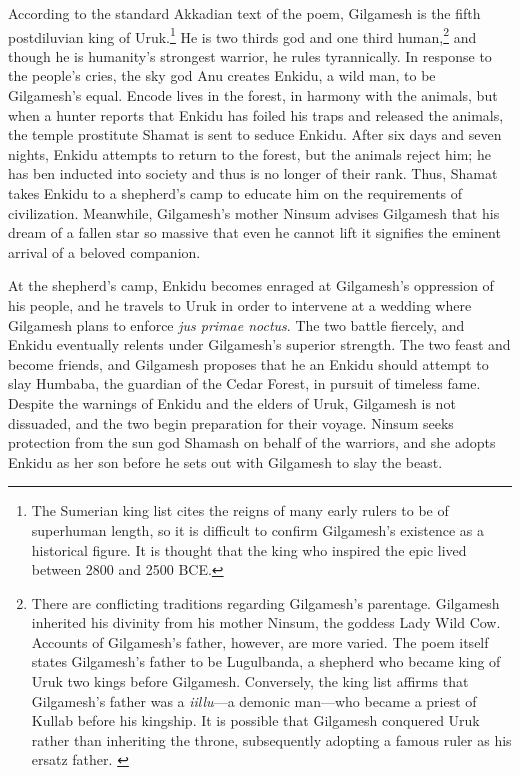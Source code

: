 \documentclass[10pt,a4paper]{article}
\begin{document}
According to the standard Akkadian text of the poem, Gilgamesh is the fifth postdiluvian king of Uruk.\footnote{The Sumerian king list cites the reigns of many early rulers to be of superhuman length, so it is difficult to confirm Gilgamesh’s existence as a historical figure. It is thought that the king who inspired the epic lived between 2800 and 2500 BCE.\cite{dalley2000myths}} He is two thirds god and one third human,\footnote{There are conflicting traditions regarding Gilgamesh’s parentage. Gilgamesh inherited his divinity from his mother Ninsum, the goddess Lady Wild Cow. Accounts of Gilgamesh’s father, however, are more varied. The poem itself states Gilgamesh’s father to be Lugulbanda, a shepherd who became king of Uruk two kings before Gilgamesh. Conversely, the king list affirms that Gilgamesh’s father was a \emph{iillu}—a demonic man—who became a priest of Kullab before his kingship. It is possible that Gilgamesh conquered Uruk rather than inheriting the throne, subsequently adopting a famous ruler as his ersatz father. \cite{dalley2000myths}} and though he is humanity’s strongest warrior, he rules tyrannically. In response to the people’s cries, the sky god Anu creates Enkidu, a wild man, to be Gilgamesh’s equal. Encode lives in the forest, in harmony with the animals, but when a hunter reports that Enkidu has foiled his traps and released the animals, the temple prostitute Shamat is sent to seduce Enkidu. After six days and seven nights, Enkidu attempts to return to the forest, but the animals reject him; he has ben inducted into society and thus is no longer of their rank. Thus, Shamat takes Enkidu to a shepherd’s camp to educate him on the requirements of civilization. Meanwhile, Gilgamesh’s mother Ninsum advises Gilgamesh that his dream of a fallen star so massive that even he cannot lift it signifies the eminent arrival of a beloved companion.

At the shepherd’s camp, Enkidu becomes enraged at Gilgamesh’s oppression of his people, and he travels to Uruk in order to intervene at a wedding where Gilgamesh plans to enforce \emph{jus primae noctus}. The two battle fiercely, and Enkidu eventually relents under Gilgamesh’s superior strength. The two feast and become friends, and Gilgamesh proposes that he an Enkidu should attempt to slay Humbaba, the guardian of the Cedar Forest, in pursuit of timeless fame. Despite the warnings of Enkidu and the elders of Uruk, Gilgamesh is not dissuaded, and the two begin preparation for their voyage. Ninsum seeks protection from the sun god Shamash on behalf of the warriors, and she adopts Enkidu as her son before he sets out with Gilgamesh to slay the beast.
\end{document}
